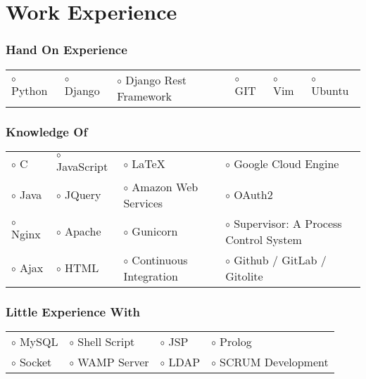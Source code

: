\documentclass[10pt]{article}
\begin{document}
\section*{Work Experience}

\subsubsection*{Hand On Experience}

\begin{tabular}{l l l l l l}
 $\circ$ Python &
 $\circ$ Django &
 $\circ$ Django Rest Framework &
 $\circ$ GIT &
 $\circ$ Vim &
 $\circ$ Ubuntu \\
\end{tabular}

\subsubsection*{Knowledge Of}

\begin{tabular}{l l l l}
 $\circ$ C &
 $\circ$ JavaScript &
 $\circ$ \LaTeX{} &
 $\circ$ Google Cloud Engine \\
 $\circ$ Java &
 $\circ$ JQuery &
 $\circ$ Amazon Web Services &
 $\circ$ OAuth2 \\
 $\circ$ Nginx &
 $\circ$ Apache &
 $\circ$ Gunicorn &
 $\circ$ Supervisor: A Process Control System \\
 $\circ$ Ajax &
 $\circ$ HTML &
 $\circ$ Continuous Integration &
 $\circ$ Github / GitLab / Gitolite \\
\end{tabular}

\subsubsection*{Little Experience With}

\begin{tabular}{l l l l}
 $\circ$ MySQL &
 $\circ$ Shell Script &
 $\circ$ JSP &
 $\circ$ Prolog \\
 $\circ$ Socket &
 $\circ$ WAMP Server &
 $\circ$ LDAP &
 $\circ$ SCRUM Development \\
\end{tabular}
\end{document}
